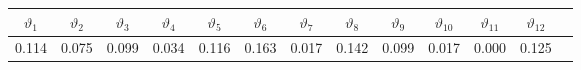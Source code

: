 \begin{tabular}{ccccccccccccc}
\hline
\hline
\textbf{$\vartheta_1$} & \textbf{$\vartheta_2$} & \textbf{$\vartheta_3$} & \textbf{$\vartheta_4$} & \textbf{$\vartheta_5$} & \textbf{$\vartheta_6$} & \textbf{$\vartheta_7$} & \textbf{$\vartheta_8$} & \textbf{$\vartheta_9$} & \textbf{$\vartheta_{10}$} & \textbf{$\vartheta_{11}$} & \textbf{$\vartheta_{12}$} \\
\hline
0.114 & 0.075 & 0.099 & 0.034 & 0.116 & 0.163 & 0.017 & 0.142 & 0.099 & 0.017 & 0.000 & 0.125 \\
\hline
\end{tabular}